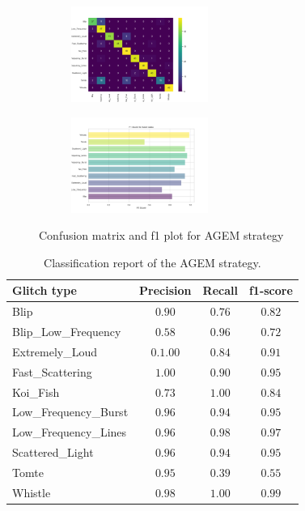 \begin{figure}[H]
\centering
\begin{subfigure}
  \centering
  \includegraphics[width=0.49\textwidth]{Images/cm_AGEM_MultiView_100epochs.png}  
  \label{fig:sub-first}
\end{subfigure}
\begin{subfigure}
  \centering
  \includegraphics[width=0.49\textwidth]{Grad Assignment/Images/f1_AGEM_MultiView_100epochs.png}  
  \label{fig:sub-second}
\end{subfigure}
\caption{Confusion matrix and f1 plot for AGEM strategy}
\label{fig:cm_f1_agem_baseline}
\end{figure}

\begin{table}
\centering

    \begin{tabular}{|l|c c c|}
    \hline
    \textbf{Glitch type} & \textbf{Precision} & \textbf{Recall} & \textbf{f1-score} \\ \hline
    Blip & $0.90$ & $0.76$ & $0.82$ \\
    Blip\_Low\_Frequency & $0.58$ & $0.96$ & $0.72$\\
    Extremely\_Loud & $0.1.00$ & $0.84$ &  $0.91$\\
    Fast\_Scattering & $1.00$ & $0.90$ &  $0.95$\\
    Koi\_Fish & $0.73$ & $1.00$ & $0.84$\\
    Low\_Frequency\_Burst & $0.96$ & $0.94$ & $0.95$\\
    Low\_Frequency\_Lines & $0.96$ & $0.98$ & $0.97$\\
    Scattered\_Light & $0.96$ & $0.94$ &$0.95$ \\
    Tomte & $0.95$ & $0.39$ &$0.55$ \\
    Whistle & $0.98$ & $1.00$ & $0.99$ \\
    \hline
    \end{tabular}
    \caption{Classification report of the AGEM strategy.}
    \label{tbl:RQ1_class_report_agem}
\end{table}

